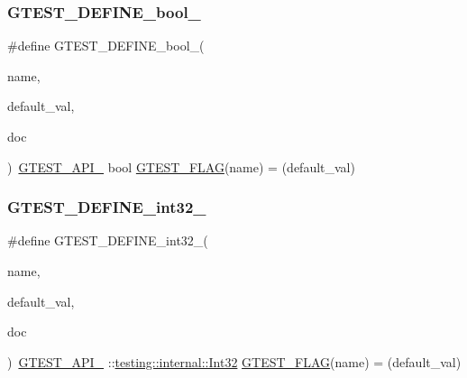 \mbox{\label{gtest-port_8h_a48e05814779e5a2f432b06a12618a760}} 
\subsubsection{\texorpdfstring{GTEST\_DEFINE\_bool\_}{GTEST\_DEFINE\_bool\_}}
{\footnotesize\ttfamily \#define G\+T\+E\+S\+T\+\_\+\+D\+E\+F\+I\+N\+E\+\_\+bool\+\_\+(\begin{DoxyParamCaption}\item[{}]{name,  }\item[{}]{default\+\_\+val,  }\item[{}]{doc }\end{DoxyParamCaption})~\mbox{\hyperlink{gtest-port_8h_aa73be6f0ba4a7456180a94904ce17790}{G\+T\+E\+S\+T\+\_\+\+A\+P\+I\+\_\+}} bool \mbox{\hyperlink{gtest-port_8h_a828f4e34a1c4b510da50ec1563e3562a}{G\+T\+E\+S\+T\+\_\+\+F\+L\+AG}}(name) = (default\+\_\+val)}

\mbox{\label{gtest-port_8h_a88ee2f19589ffff86ca742fd33611358}} 
\subsubsection{\texorpdfstring{GTEST\_DEFINE\_int32\_}{GTEST\_DEFINE\_int32\_}}
{\footnotesize\ttfamily \#define G\+T\+E\+S\+T\+\_\+\+D\+E\+F\+I\+N\+E\+\_\+int32\+\_\+(\begin{DoxyParamCaption}\item[{}]{name,  }\item[{}]{default\+\_\+val,  }\item[{}]{doc }\end{DoxyParamCaption})~\mbox{\hyperlink{gtest-port_8h_aa73be6f0ba4a7456180a94904ce17790}{G\+T\+E\+S\+T\+\_\+\+A\+P\+I\+\_\+}} \+::\mbox{\hyperlink{namespacetesting_1_1internal_a8ee38faaf875f133358abaf9bc056cec}{testing\+::internal\+::\+Int32}} \mbox{\hyperlink{gtest-port_8h_a828f4e34a1c4b510da50ec1563e3562a}{G\+T\+E\+S\+T\+\_\+\+F\+L\+AG}}(name) = (default\+\_\+val)}

\mbox{\label{gtest-port_8h_a85d5cd679fdbe87383e7dfd1c6651eaa}} 
